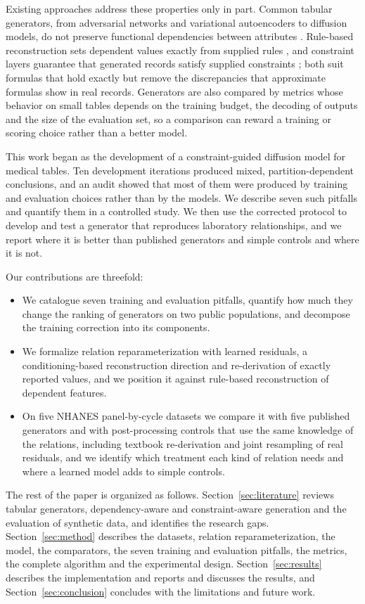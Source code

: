 \documentclass[conference]{IEEEtran}
\begin{document}
Existing approaches address these properties only in part. Common tabular generators, from adversarial networks and variational autoencoders to diffusion models, do not preserve functional dependencies between attributes \cite{umesh2024dependencies}. Rule-based reconstruction sets dependent values exactly from supplied rules \cite{umesh2025hfgf}, and constraint layers guarantee that generated records satisfy supplied constraints \cite{stoian2024cdgm}; both suit formulas that hold exactly but remove the discrepancies that approximate formulas show in real records. Generators are also compared by metrics whose behavior on small tables depends on the training budget, the decoding of outputs and the size of the evaluation set, so a comparison can reward a training or scoring choice rather than a better model.

This work began as the development of a constraint-guided diffusion model for medical tables. Ten development iterations produced mixed, partition-dependent conclusions, and an audit showed that most of them were produced by training and evaluation choices rather than by the models. We describe seven such pitfalls and quantify them in a controlled study. We then use the corrected protocol to develop and test a generator that reproduces laboratory relationships, and we report where it is better than published generators and simple controls and where it is not.

Our contributions are threefold:
\begin{itemize}
\item We catalogue seven training and evaluation pitfalls, quantify how much they change the ranking of generators on two public populations, and decompose the training correction into its components.
\item We formalize relation reparameterization with learned residuals, a conditioning-based reconstruction direction and re-derivation of exactly reported values, and we position it against rule-based reconstruction of dependent features.
\item On five NHANES panel-by-cycle datasets we compare it with five published generators and with post-processing controls that use the same knowledge of the relations, including textbook re-derivation and joint resampling of real residuals, and we identify which treatment each kind of relation needs and where a learned model adds to simple controls.
\end{itemize}

The rest of the paper is organized as follows. Section~\ref{sec:literature} reviews tabular generators, dependency-aware and constraint-aware generation and the evaluation of synthetic data, and identifies the research gaps. Section~\ref{sec:method} describes the datasets, relation reparameterization, the model, the comparators, the seven training and evaluation pitfalls, the metrics, the complete algorithm and the experimental design. Section~\ref{sec:results} describes the implementation and reports and discusses the results, and Section~\ref{sec:conclusion} concludes with the limitations and future work.
\end{document}
